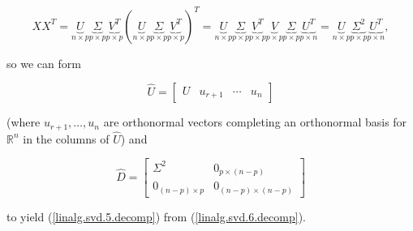 \begin{equation}\label{linalg.svd.6.decomp}
XX^T =  \underbrace{U}_{n \times p} \underbrace{\Sigma}_{p \times p} \underbrace{V^T}_{p \times p} (\underbrace{U}_{n \times p} \underbrace{\Sigma}_{p \times p} \underbrace{V^T}_{p \times p})^T
=  \underbrace{U}_{n \times p} \underbrace{\Sigma}_{p \times p} \underbrace{V^T}_{p \times p} \underbrace{V}_{p \times p} \underbrace{\Sigma}_{p \times p}  \underbrace{U^T}_{p \times n} = \underbrace{U}_{n \times p} \underbrace{\Sigma^2}_{p \times p}  \underbrace{U^T}_{p \times n},
\end{equation}

so we can form 

\[
\hat{U} = \begin{bmatrix} U & u_{r+1} & \cdots & u_n \end{bmatrix}
\] 

(where \(u_{r+1}, \ldots, u_n\) are orthonormal vectors completing an orthonormal basis for \(\mathbb{R}^n\) in the columns of \(\hat{U}\)) and

\[
\hat{D} = \begin{bmatrix}
\Sigma^2 & 0_{p \times (n-p)} \\
0_{ (n-p) \times p} & 0_{(n-p) \times (n-p)} 
\end{bmatrix}
\]

to yield (\ref{linalg.svd.5.decomp}) from (\ref{linalg.svd.6.decomp}).




